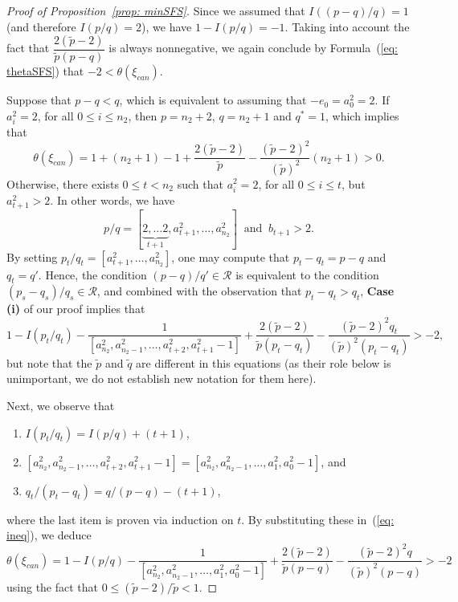 \documentclass[11pt]{amsart}
\theoremstyle{plain}
\theoremstyle{definition}
\theoremstyle{remark}
\numberwithin{theorem}{section}
\begin{document}
\begin{proof}[Proof of Proposition~\ref{prop: minSFS}]
Since we assumed that $I((p-q)/q)=1$ (and therefore $I(p/q)=2$), we have $1- I(p/q) = -1$. Taking into account the fact that $\dfrac{2(\widetilde{p}-2)}{\widetilde{p}(p-q)}$ is always nonnegative, we again conclude by Formula~(\ref{eq: thetaSFS}) that $-2 < \theta (\xi_{can})$. 

\smallskip

 Suppose that $p-q <q$, which is equivalent to assuming that $-e_0=a^2_0 = 2$. If  $a^2_i =2$, for all $0 \leq i \leq n_2$, then $p=n_2+2$, $q=n_2+1$ and $q^*=1$, which implies that 
\[
\theta (\xi_{can}) =1+(n_2+1)-1+\dfrac{2(\widetilde{p}-2)}{\widetilde{p}} -\dfrac{(\widetilde{p}-2)^2 }{(\widetilde{p})^2} (n_2+1)> 0.
\]
 Otherwise,  there exists $0 \leq t < n_2$ such that $a^2_i =2$, for all $0 \leq i \leq t$, but $a^2_{t+1} > 2$. In other words,  we have 
 \[
 p/q = [\underbrace{2, \ldots 2}_{t+1}, a^2_{t+1},  \ldots, a^2_{n_2}] \;\; \mbox{and} \;\; b_{t+1} > 2.
 \]  
 By setting $p_t/q_t=[a^2_{t+1},  \ldots, a^2_{n_2}]$, one may compute that $p_t -q_t =p-q$ and $ q_t=q'$. Hence, the condition  $(p-q)/q' \in\mathcal{R}$ is equivalent to the condition  $(p_s -q_s) /q_s \in \mathcal{R}$, and combined with the observation that $p_t-q_t > q_t$,  {\bf Case (i)} of our proof  implies that 
 \begin{equation} \label{eq: ineq} 
 1- I(p_t/q_t)-\dfrac{1}{[a^2_{n_2}, a^2_{n_2-1}, \ldots, a^2_{t+2}, a^2_{t+1}-1]} +\dfrac{2(\widetilde{p}-2)}{\widetilde{p}(p_t-q_t)} -\dfrac{(\widetilde{p}-2)^2 q_t}{(\widetilde{p})^2(p_t-q_t)} > -2,
 \end{equation} 
  but note that the $\widetilde{p}$ and $\widetilde{q}$ are different in this equations (as their role below is unimportant, we do not establish new notation for them here). 

  Next, we observe that 
\begin{enumerate}[label=(\roman*)]
  \item $I(p_t/q_t)=I(p/q)+(t +1)$,
 \item $[a^2_{n_2}, a^2_{n_2-1}, \ldots, a^2_{t+2}, a^2_{t+1}-1] = [a^2_{n_2}, a^2_{n_2-1}, \ldots, a^2_1, a^2_0-1]$, and
  \item $q_t/(p_t-q_t) =q/(p-q)-(t+1)$,
\end{enumerate} 
where the last item is proven via induction on $t$.
By substituting these in~(\ref{eq: ineq}), we deduce  
 $$\theta (\xi_{can}) =1- I(p/q)-\dfrac{1}{[a^2_{n_2}, a^2_{n_2-1}, \ldots, a^2_1, a^2_0-1]} +\dfrac{2(\widetilde{p}-2)}{\widetilde{p}(p-q)} -\dfrac{(\widetilde{p}-2)^2 q}{(\widetilde{p})^2(p-q)} > -2$$ using the fact that $ 0 \leq (\widetilde{p}-2)/\widetilde{p} < 1$. 
\end{proof}
\end{document}
